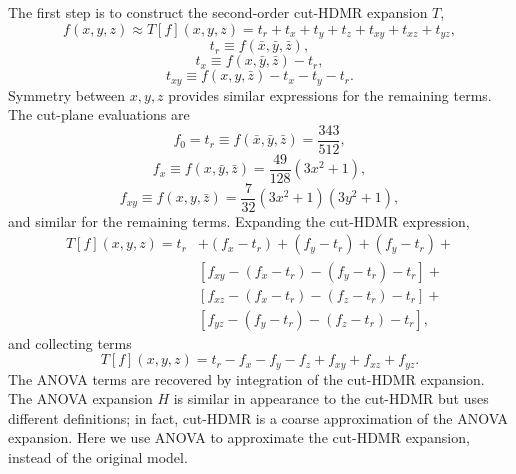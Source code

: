 The first step is to construct the second-order cut-HDMR expansion $T$,
\begin{equation}
  f(x,y,z) \approx T[f](x,y,z) = t_r + t_x + t_y + t_z + t_{xy} + t_{xz} + t_{yz},
\end{equation}
\begin{equation}
  t_r \equiv f(\bar x,\bar y,\bar z),
\end{equation}
\begin{equation}
  t_x \equiv f(x,\bar y,\bar z) -t_r,
\end{equation}
\begin{equation}
  t_{xy} \equiv f(x,y,\bar z) - t_x - t_y - t_r.
\end{equation}
Symmetry between $x,y,z$ provides similar expressions for the remaining terms.
The cut-plane evaluations are
\begin{equation}
  f_0 = t_r \equiv f(\bar x,\bar y,\bar z) = \frac{343}{512},
\end{equation}
\begin{equation}
  f_x \equiv f(x,\bar y, \bar z) = \frac{49}{128}(3x^2+1),
\end{equation}
\begin{equation}
  f_{xy} \equiv f(x,y, \bar z) = \frac{7}{32}(3x^2+1)(3y^2+1),
\end{equation}
and similar for the remaining terms.  Expanding the cut-HDMR expression,
\begin{align}
  T[f](x,y,z) = t_r &+ (f_x-t_r) + (f_y-t_r) + (f_y-t_r) +\nonumber\\
  &[f_{xy} - (f_x-t_r) - (f_y-t_r) - t_r]+ \nonumber\\
  &[f_{xz} - (f_x-t_r) - (f_z-t_r) - t_r]+ \nonumber\\
  &[f_{yz} - (f_y-t_r) - (f_z-t_r) - t_r],
\end{align}
and collecting terms
\begin{equation}
  T[f](x,y,z) = t_r - f_x - f_y - f_z + f_{xy} + f_{xz} + f_{yz}. 
\end{equation}
The ANOVA terms are recovered by integration of the cut-HDMR expansion.  The ANOVA expansion $H$ is similar in
appearance to the cut-HDMR but uses different definitions; in fact, cut-HDMR is a coarse approximation of the
ANOVA expansion.  Here we use ANOVA to approximate the cut-HDMR expansion, instead of the original model.

